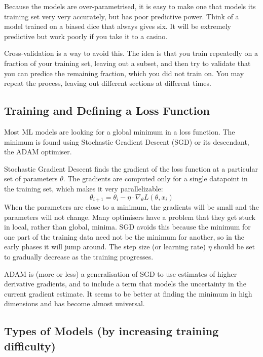 \documentclass[12pt]{article}
\begin{document}
Because the models are over-parametrised, it is easy to make one that models its training set very very accurately, but has poor predictive power. Think of a model trained on a biased dice that always gives six. It will be extremely predictive but work poorly if you take it to a casino.

Cross-validation is a way to avoid this. The idea is that you train repeatedly on a fraction of your training set, leaving out a subset, and then try to validate that you can predice the remaining fraction, which you did not train on. You may repeat the process, leaving out different sections at different times.

\subsection{Training and Defining a Loss Function}

Most ML models are looking for a global minimum in a loss function. The minimum is found using Stochastic Gradient Descent (SGD) or its descendant, the ADAM optimiser.

Stochastic Gradient Descent finds the gradient of the loss function at a particular set of parameters $\theta$. The gradients are computed only for a single datapoint in the training set, which makes it very parallelizable:
\begin{equation}
 \theta_{i+1} = \theta_i - \eta \cdot \nabla_\theta L (\theta, x_i)
\end{equation}
When the parameters are close to a minimum, the gradients will be small and the parameters will not change. Many optimisers have a problem that they get stuck in local, rather than global, minima. SGD avoids this because the minimum for one part of the training data need not be the minimum for another, so in the early phases it will jump around. The step size (or learning rate) $\eta$ should be set to gradually decrease as the training progresses.

ADAM is (more or less) a generalisation of SGD to use estimates of higher derivative gradients, and to include a term that models the uncertainty in the current gradient estimate. It seems to be better at finding the minimum in high dimensions and has become almost universal.

\subsection{Types of Models (by increasing training difficulty)}
\end{document}

